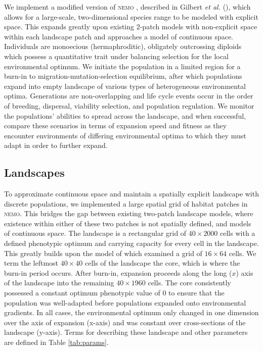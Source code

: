 We implement a modified version of \textsc{nemo} \citep{Guillaume:2006}, described in Gilbert \emph{et al.} (), which allows for a large-scale, two-dimensional species range to be modeled with explicit space. This expands greatly upon existing 2-patch models with non-explicit space within each landscape patch and approaches a model of continuous space. Individuals are monoecious (hermaphroditic), obligately outcrossing diploids which possess a quantitative trait under balancing selection for the local environmental optimum. We initiate the population in a limited region for a burn-in to migration-mutation-selection equilibrium, after which populations expand into empty landscape of various types of heterogeneous environmental optima. Generations are non-overlapping and life cycle events occur in the order of breeding, dispersal, viability selection, and population regulation. We monitor the populations' abilities to spread across the landscape, and when successful, compare these scenarios in terms of expansion speed and fitness as they encounter environments of differing environmental optima to which they must adapt in order to further expand.


\subsection{Landscapes}

To approximate continuous space and maintain a spatially explicit landscape with discrete populations, we implemented a large spatial grid of habitat patches in \textsc{nemo}. This bridges the gap between existing two-patch landscape models, where existence within either of these two patches is not spatially defined, and models of continuous space. The landscape is a rectangular grid of $40\times2000$ cells with a defined phenotypic optimum and carrying capacity for every cell in the landscape. 
This greatly builds upon the model of \citet{Schiffers:2014} which examined a grid of $16\times64$ cells. We term the leftmost $40\times40$ cells of the landscape the core, which is where the burn-in period occurs. After burn-in, expansion proceeds along the long ($x$) axis of the landscape into the remaining $40\times1960$ cells. The core consistently possessed a constant optimum phenotypic value of 0 to ensure that the population was well-adapted before populations expanded onto environmental gradients. In all cases, the environmental optimum only changed in one dimension over the axis of expansion (x-axis) and was constant over cross-sections of the landscape (y-axis). Terms for describing these landscape and other parameters are defined in Table \ref{tab:params}.

